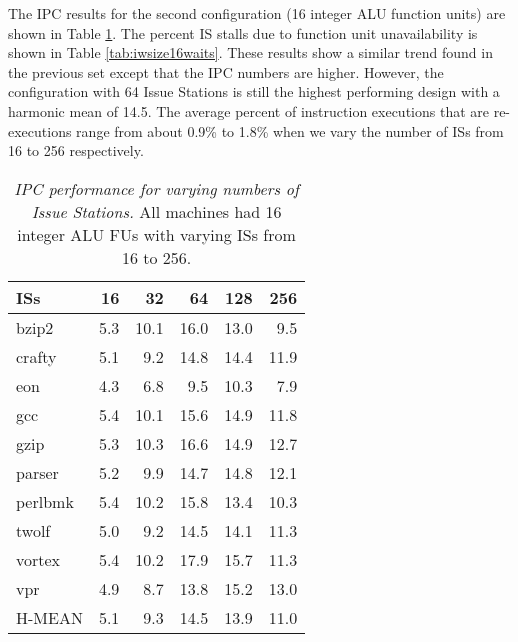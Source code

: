 \documentclass[10pt,dvips]{article}
\begin{document}
The IPC results for the 
second configuration (16 integer ALU function units)
are shown in Table \ref{tab:iwsize16ipc}.
The percent IS stalls due to function unit unavailability
is shown in Table \ref{tab:iwsize16waits}.
These results show a similar trend found in the previous set
except that the IPC numbers are higher.
However, the configuration with 64 Issue Stations is still
the highest performing design with a harmonic mean of 14.5.
The average percent of instruction executions that are re-executions
range from about 0.9\% to 1.8\% 
when we vary the number of ISs from 16 to 256 respectively.
%
\begin{table}[p]
\begin{center}
\caption{{\em IPC performance for varying numbers of
Issue Stations.}
All machines had 16 integer ALU FUs with varying ISs from 16 to 256.}
\label{tab:iwsize16ipc}
\vspace{+0.1in}
\begin{tabular}{|l||r|r|r|r|r|}
\hline 
{ISs}& 16 & 32 & 64 & 128 & 256 \\
\hline

\hline
bzip2&
5.3 &  10.1	&  16.0 	&  13.0	&   9.5 \\

\hline
crafty&
5.1 &   9.2	&  14.8	&  14.4	&  11.9 \\

\hline
eon&
4.3 &   6.8	&   9.5	&  10.3	&   7.9 \\

\hline
gcc&
5.4 &  10.1	&  15.6	&  14.9	&  11.8 \\

\hline
gzip&
5.3 &  10.3	&  16.6	&  14.9	&  12.7 \\

\hline
parser&
5.2 &   9.9	&  14.7	&  14.8	&  12.1 \\

\hline
perlbmk&
5.4 &  10.2	&  15.8	&  13.4	& 10.3 \\

\hline
twolf&
5.0 &   9.2	&  14.5	&  14.1	& 11.3 \\

\hline
vortex&
5.4 &  10.2	&  17.9	&  15.7	& 11.3 \\

\hline
vpr&
4.9 &   8.7	&  13.8	&  15.2	& 13.0 \\

\hline
H-MEAN&
5.1 & 9.3 & 14.5 & 13.9 & 11.0 \\

\hline
\end{tabular}
\end{center}
\end{table}
\end{document}

